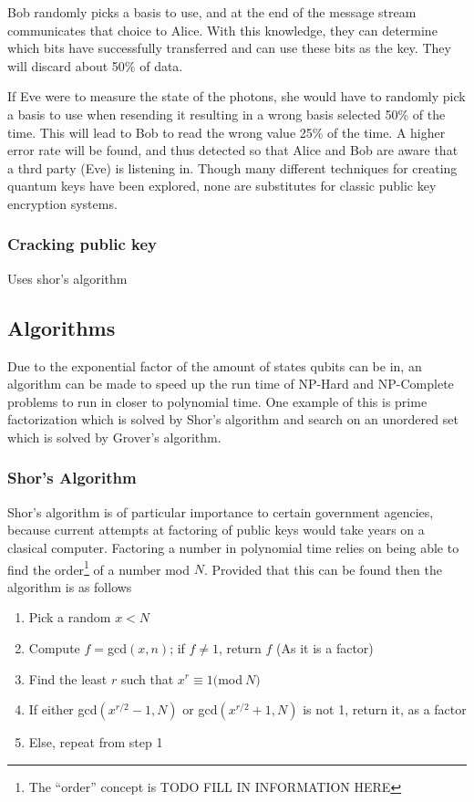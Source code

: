 \documentclass[12pt]{article}
\begin{document}
Bob randomly picks a basis to use, and at the end of the message stream communicates that choice to Alice. With this knowledge, they can determine which bits have successfully transferred and can use these bits as the key. They will discard about 50\% of data.\par
If Eve were to measure the state of the photons, she would have to randomly pick a basis to use when resending it resulting in a wrong basis selected 50\% of the time. This will lead to Bob to read the wrong value 25\% of the time. A higher error rate will be found, and thus detected so that Alice and Bob are aware that a thrd party (Eve) is listening in.
Though many different techniques for creating quantum keys have been explored, none are substitutes for classic public key encryption systems.
\subsubsection{Cracking public key}
Uses shor's algorithm
\subsection{Algorithms}
Due to the exponential factor of the amount of states qubits can be in, an algorithm can be made to speed up the run time of NP-Hard and NP-Complete problems to run in closer to polynomial time. One example of this is prime factorization which is solved by Shor's algorithm and search on an unordered set which is solved by Grover's algorithm.
\subsubsection{Shor's Algorithm}
Shor's algorithm is of particular importance to certain government agencies, because current attempts at factoring of public keys would take years on a clasical computer. Factoring a number in polynomial time relies on being able to find the order\footnote{The ``order'' concept is TODO FILL IN INFORMATION HERE} of a number mod $N$.\cite{cis4930} Provided that this can be found then the algorithm is as follows
\begin{enumerate}
\item Pick a random $x<N$
\item Compute $f = $gcd$(x, n)$; if $f\neq 1$, return $f$ (As it is a factor)
\item Find the least $r$ such that $x^r\equiv 1 ($mod$\:N)$
\item If either gcd$(x^{r/2}-1, N)$ or gcd$(x^{r/2}+1, N)$ is not 1, return it, as a factor
\item Else, repeat from step 1
\end{enumerate}
\end{document}
